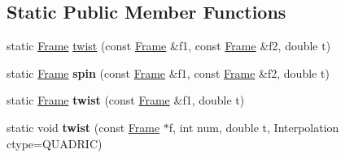 \subsection*{Static Public Member Functions}
\begin{DoxyCompactItemize}
\item 
static \hyperlink{classvsr_1_1_frame}{Frame} \hyperlink{classvsr_1_1_frame_a1dd0d76934f8b36f5b62115bf845b246}{twist} (const \hyperlink{classvsr_1_1_frame}{Frame} \&f1, const \hyperlink{classvsr_1_1_frame}{Frame} \&f2, double t)
\item 
\hypertarget{classvsr_1_1_frame_a5d80066ee152280052e2ad7eb0f6222a}{static \hyperlink{classvsr_1_1_frame}{Frame} {\bfseries spin} (const \hyperlink{classvsr_1_1_frame}{Frame} \&f1, const \hyperlink{classvsr_1_1_frame}{Frame} \&f2, double t)}\label{classvsr_1_1_frame_a5d80066ee152280052e2ad7eb0f6222a}

\item 
\hypertarget{classvsr_1_1_frame_a485a6c5cda206100188e6673aeaa7f30}{static \hyperlink{classvsr_1_1_frame}{Frame} {\bfseries twist} (const \hyperlink{classvsr_1_1_frame}{Frame} \&f1, double t)}\label{classvsr_1_1_frame_a485a6c5cda206100188e6673aeaa7f30}

\item 
\hypertarget{classvsr_1_1_frame_ac9f9f9a4ba8200131911c0348229f0df}{static void {\bfseries twist} (const \hyperlink{classvsr_1_1_frame}{Frame} $\ast$f, int num, double t, Interpolation ctype=Q\-U\-A\-D\-R\-I\-C)}\label{classvsr_1_1_frame_ac9f9f9a4ba8200131911c0348229f0df}

\end{DoxyCompactItemize}
